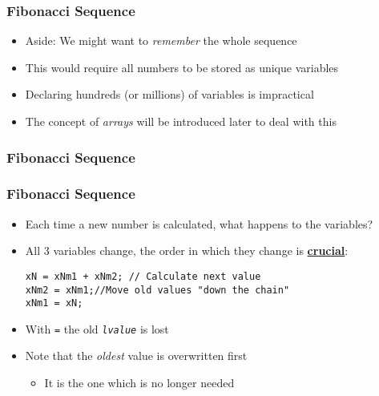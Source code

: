 \documentclass[14pt]{beamer}
\begin{document}
\begin{frame}
\frametitle{Fibonacci Sequence}
\begin{itemize}
\item Aside: We might want to \textit{remember} the whole sequence
\item This would require all numbers to be stored as unique variables
\item Declaring hundreds (or millions) of variables is impractical
\item The concept of \textit{arrays} will be introduced later to deal with this
\end{itemize}
\end{frame}

\begin{frame}[fragile]
\frametitle{Fibonacci Sequence}
\end{frame}

\begin{frame}[fragile]
\frametitle{Fibonacci Sequence}
\begin{itemize}
\item Each time a new number is calculated, what happens to the variables?
\item All 3 variables change, the order in which they change is \underline{\textbf{crucial}}:
	\begin{lstlisting}[style=CStyle]
xN = xNm1 + xNm2; // Calculate next value
xNm2 = xNm1;//Move old values "down the chain"
xNm1 = xN;
\end{lstlisting}
\item With \texttt{=} the old \texttt{\textit{lvalue}} is lost
\item Note that the \textit{oldest} value is overwritten first
	\begin{itemize}
		\item It is the one which is no longer needed
	\end{itemize}
\end{itemize}
\end{frame}
\end{document}

